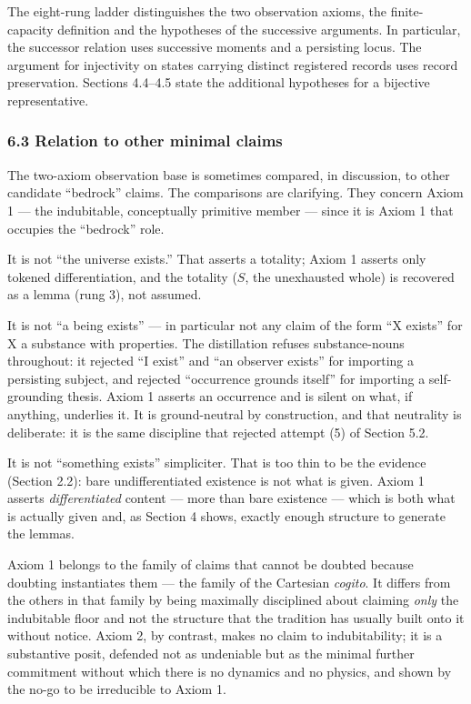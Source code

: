 \documentclass[
]{article}
\begin{document}
The eight-rung ladder distinguishes the two observation axioms, the
finite-capacity definition and the hypotheses of the successive
arguments. In particular, the successor relation uses successive moments
and a persisting locus. The argument for injectivity on states carrying
distinct registered records uses record preservation. Sections 4.4--4.5
state the additional hypotheses for a bijective representative.

\hypertarget{relation-to-other-minimal-claims}{%
\subsubsection{6.3 Relation to other minimal
claims}\label{relation-to-other-minimal-claims}}

The two-axiom observation base is sometimes compared, in discussion, to
other candidate ``bedrock'' claims. The comparisons are clarifying. They
concern Axiom 1 --- the indubitable, conceptually primitive member ---
since it is Axiom 1 that occupies the ``bedrock'' role.

It is not ``the universe exists.'' That asserts a totality; Axiom 1
asserts only tokened differentiation, and the totality (\(S\), the
unexhausted whole) is recovered as a lemma (rung 3), not assumed.

It is not ``a being exists'' --- in particular not any claim of the form
``X exists'' for X a substance with properties. The distillation refuses
substance-nouns throughout: it rejected ``I exist'' and ``an observer
exists'' for importing a persisting subject, and rejected ``occurrence
grounds itself'' for importing a self-grounding thesis. Axiom 1 asserts
an occurrence and is silent on what, if anything, underlies it. It is
ground-neutral by construction, and that neutrality is deliberate: it is
the same discipline that rejected attempt (5) of Section 5.2.

It is not ``something exists'' simpliciter. That is too thin to be the
evidence (Section 2.2): bare undifferentiated existence is not what is
given. Axiom 1 asserts \emph{differentiated} content --- more than bare
existence --- which is both what is actually given and, as Section 4
shows, exactly enough structure to generate the lemmas.

Axiom 1 belongs to the family of claims that cannot be doubted because
doubting instantiates them --- the family of the Cartesian
\emph{cogito}. It differs from the others in that family by being
maximally disciplined about claiming \emph{only} the indubitable floor
and not the structure that the tradition has usually built onto it
without notice. Axiom 2, by contrast, makes no claim to indubitability;
it is a substantive posit, defended not as undeniable but as the minimal
further commitment without which there is no dynamics and no physics,
and shown by the no-go to be irreducible to Axiom 1.
\end{document}

